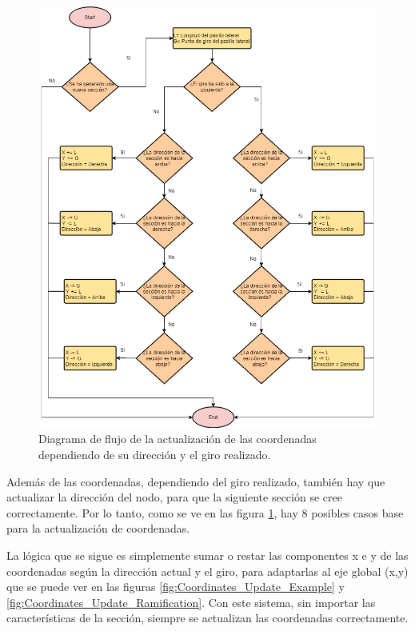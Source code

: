 \documentclass[../main.tex]{subfiles}
\begin{document}
\begin{figure}[!p]
\hspace{-1.75cm}
\includegraphics[width=1.3\textwidth]{imagenes/Coordinate_System_Flowchart.png}
\caption{Diagrama de flujo de la actualización de las coordenadas dependiendo de su dirección y el giro realizado.}
\label{fig:Coordinates_Update_System}
\end{figure}

Además de las coordenadas, dependiendo del giro realizado, también hay que actualizar la dirección del nodo, para que la siguiente sección se cree correctamente. Por lo tanto, como se ve en las figura \ref{fig:Coordinates_Update_System}, hay 8 posibles casos base para la actualización de coordenadas.

La lógica que se sigue es simplemente sumar o restar las componentes x e y de las coordenadas según la dirección actual y el giro, para adaptarlas al eje global (x,y) que se puede ver en las figuras \ref{fig:Coordinates_Update_Example} y \ref{fig:Coordinates_Update_Ramification}. Con este sistema, sin importar las características de la sección, siempre se actualizan las coordenadas correctamente.
\end{document}
